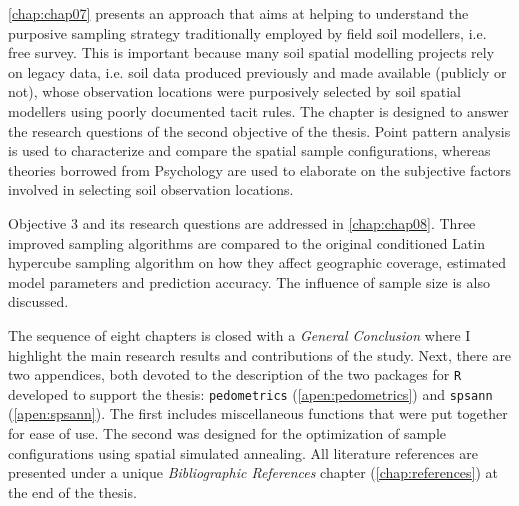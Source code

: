 \autoref{chap:chap07} presents an approach that aims at helping to understand the purposive sampling strategy 
traditionally employed by field soil modellers, i.e. free survey. This is important because many soil 
spatial modelling projects rely on legacy data, i.e. soil data produced previously and made available (publicly 
or 
not), whose observation locations were purposively selected by soil spatial modellers using poorly documented 
tacit rules. The chapter is designed to answer the research questions of the second objective of the thesis. 
Point 
pattern analysis is used to characterize and compare the spatial sample configurations, whereas theories 
borrowed 
from Psychology are used to elaborate on the subjective factors involved in selecting soil observation 
locations.

Objective 3 and its research questions are addressed in \autoref{chap:chap08}. Three improved sampling 
algorithms are compared to the original conditioned Latin hypercube sampling algorithm on how they affect 
geographic coverage, estimated model parameters and prediction accuracy. The influence of sample size is also 
discussed.

The sequence of eight chapters is closed with a \emph{General Conclusion} where I highlight the main research 
results and contributions of the study. Next, there are two appendices, both devoted to the description of the 
two 
packages for \texttt{R} developed to support the thesis: \texttt{pedometrics} (\autoref{apen:pedometrics}) 
and \texttt{spsann} (\autoref{apen:spsann}). The first includes miscellaneous functions that were put together 
for ease of use. The second was designed for the optimization of sample configurations using spatial simulated 
annealing. All literature references are presented under a unique \emph{Bibliographic References} chapter 
(\autoref{chap:references}) at the end of the thesis.


